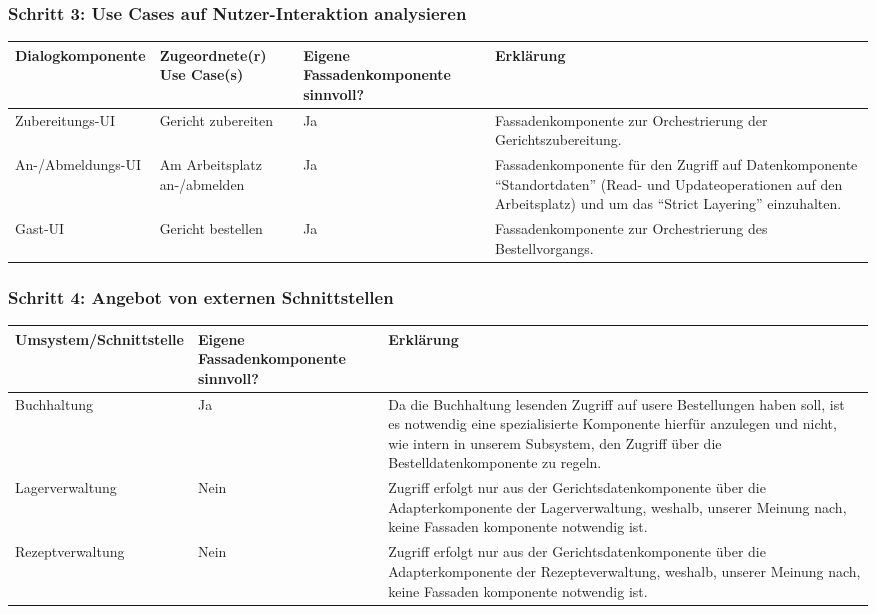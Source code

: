 
\subsubsection{Schritt 3: Use Cases auf Nutzer-Interaktion analysieren}

\begin{tabu} to \linewidth {X|X|X|X}
\hline
{}
Dialogkomponente &Zugeordnete(r) Use Case(s) &Eigene Fassadenkomponente sinnvoll?
  &Erkl\"arung \\
\hline
Zubereitungs-UI &Gericht zubereiten &Ja &Fassadenkomponente zur
  Orchestrierung der Gerichtszubereitung. \\
\hline
An-/Abmeldungs-UI &Am Arbeitsplatz an-/abmelden &Ja &Fassadenkomponente f\"ur den Zugriff auf
  Datenkomponente "`Standortdaten"' (Read- und Updateoperationen auf den Arbeitsplatz) und
  um das "`Strict Layering"' einzuhalten.\\
\hline
Gast-UI &Gericht bestellen &Ja &Fassadenkomponente zur Orchestrierung des Bestellvorgangs. \\
\hline
\end{tabu}


\subsubsection{Schritt 4: Angebot von externen Schnittstellen}

\begin{tabu} to \linewidth {X|X|X}
\hline
{}
Umsystem/Schnittstelle &Eigene Fassadenkomponente sinnvoll? &Erkl\"arung \\
\hline
Buchhaltung &Ja &Da die Buchhaltung lesenden Zugriff auf
  usere Bestellungen haben soll, ist es notwendig eine spezialisierte Komponente
  hierf\"ur anzulegen und nicht, wie intern in unserem Subsystem, den Zugriff
  \"uber die Bestelldatenkomponente zu regeln.\\
\hline
Lagerverwaltung &Nein &Zugriff erfolgt nur aus der Gerichtsdatenkomponente \"uber die
  Adapterkomponente der Lagerverwaltung, weshalb, unserer Meinung nach, keine Fassaden\-
  komponente notwendig ist. \\
\hline
Rezeptverwaltung &Nein &Zugriff erfolgt nur aus der Gerichtsdatenkomponente \"uber die
  Adapterkomponente der Rezepteverwaltung, weshalb, unserer Meinung nach, keine Fassaden\-
  komponente notwendig ist. \\
\hline
\end{tabu}

